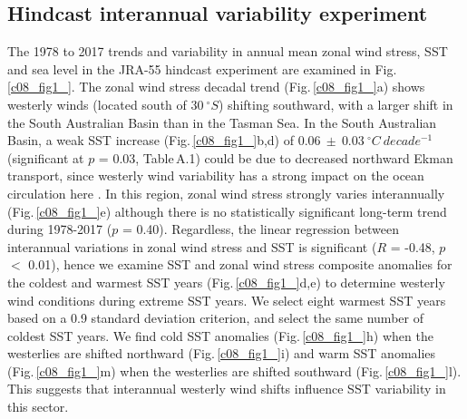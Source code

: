 \documentclass[draft,linenumbers]{agujournal2018}
\begin{document}
\subsection{Hindcast interannual variability experiment}
The 1978 to 2017 trends and variability in annual mean zonal wind stress, SST and sea level in the JRA-55 hindcast experiment are examined in Fig.\,\ref{c08_fig1_}. The zonal wind stress decadal trend (Fig.\,\ref{c08_fig1_}a) shows westerly winds (located south of $30\ ^{\circ}S$) shifting southward, with a larger shift in the South Australian Basin than in the Tasman Sea. In the South Australian Basin, a weak SST increase (Fig.\,\ref{c08_fig1_}b,d) of $0.06\ \pm\ 0.03\ ^{\circ}C\ decade^{-1}$ (significant at $p$ = 0.03, Table\,A.1) could be due to decreased northward Ekman transport, since westerly wind variability has a strong impact on the ocean circulation here \citep{Middleton2007}. In this region, zonal wind stress strongly varies interannually (Fig.\,\ref{c08_fig1_}e) although there is no statistically significant long-term trend during 1978-2017 ($p$ = 0.40). Regardless, the linear regression between interannual variations in zonal wind stress and SST is significant ($R$ = -0.48, $p$ $<$ 0.01), hence we examine SST and zonal wind stress composite anomalies for the coldest and warmest SST years (Fig.\,\ref{c08_fig1_}d,e) to determine westerly wind conditions during extreme SST years. We select eight warmest SST years based on a 0.9 standard deviation criterion, and select the same number of coldest SST years. We find cold SST anomalies (Fig.\,\ref{c08_fig1_}h) when the westerlies are shifted northward (Fig.\,\ref{c08_fig1_}i) and warm SST anomalies (Fig.\,\ref{c08_fig1_}m) when the westerlies are shifted southward (Fig.\,\ref{c08_fig1_}l). This suggests that interannual westerly wind shifts influence SST variability in this sector. 
\end{document}
